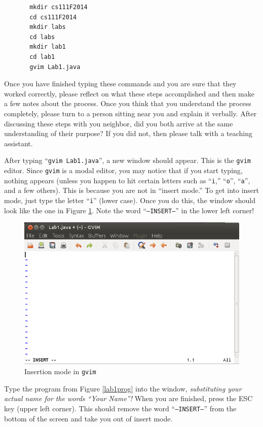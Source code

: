 \begin{verbatim}
       mkdir cs111F2014
       cd cs111F2014
       mkdir labs
       cd labs
       mkdir lab1
       cd lab1
       gvim Lab1.java
\end{verbatim}

Once you have finished typing these commands and you are sure that they worked correctly, please reflect on what these
steps accomplished and then make a few notes about the process.  Once you think that you understand the process
completely, please turn to a person sitting near you and explain it verbally.  After discussing these steps with you
neighbor, did you both arrive at the same understanding of their purpose? If you did not, then please talk with a teaching
assistant. 

After typing ``{\tt gvim Lab1.java}'', a new window should appear. This is the {\tt gvim} editor.  Since {\tt gvim} is a
modal editor, you may notice that if you start typing, nothing appears (unless you happen to hit certain letters such as
  ``{\tt i},'' ``{\tt o}'', ``{\tt a}'', and a few others). This is because you are not in ``insert mode.'' To get into
insert mode, just type the letter ``{\tt i}'' (lower case). Once you do this, the window should look like the one in
Figure \ref{gvim-insert}. Note the word ``{\tt --INSERT--}'' in the lower left corner!

       \begin{figure}[htbp]
         \centering
         \includegraphics[width=4.5in]{images/gvim-insert}
         \caption{Insertion mode in {\tt gvim}}
         \label{gvim-insert}
       \end{figure}

       Type the program from Figure
       \ref{lab1prog} into the window, {\em substituting your actual name for the words
         ``Your Name''!} When you are finished, press the ESC key (upper left corner).
       This should remove the word ``{\tt --INSERT--}'' from the bottom of the screen 
       and take you out of insert mode.

